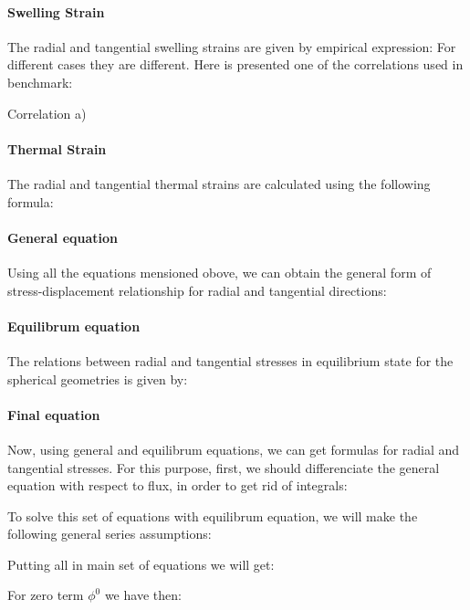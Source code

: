 \documentclass[review]{elsarticle}
\begin{document}
\paragraph{Swelling Strain} The radial and tangential swelling strains are given by  empirical expression: 
For different cases they are different. Here is presented one of the correlations used in benchmark:

Correlation a)
\StrainSwelling


\paragraph{Thermal Strain} The radial and tangential thermal strains are calculated using the following formula:
\StrainThermal 

\paragraph{General equation} Using all the equations mensioned obove, we can obtain the general form of stress-displacement relationship for radial and tangential directions:

\GeneralStrDisRadial
\GeneralStrDisTangential

\paragraph{Equilibrum equation} The relations between radial and tangential stresses in equilibrium state for the spherical geometries is given by:
\EquilibrumStress 

\paragraph{Final equation} 
Now, using general and equilibrum equations, we can get formulas for radial and tangential stresses. For this purpose, first, we should differenciate the general equation with respect to flux, in order to get rid of integrals:
\EquationsForFinRad
\EquationsForFinTan

To solve this set of equations with equilibrum equation, we will make the following general series assumptions:
\DisplaceSeries
\StressSeries
\StrainSeries


Putting all in main set of equations we will get:
\MainSetRadOne
\MainSetRadTwo

\MainSetTanOne
\MainSetTanTwo

For zero term $\phi^0$ we have then:
\MainSetTermZeroRad
\MainSetTermZeroTan
\end{document}
